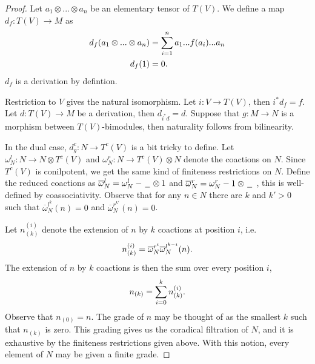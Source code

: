 \documentclass[../thesis.tex]{subfiles}
\begin{document}
            \begin{proof}
                Let $a_1\otimes ... \otimes a_n$ be an elementary tensor of $T(V)$. We define a map $d_f : T(V) \rightarrow M$ as
                \begin{align*}
                    d_f(a_1\otimes ... \otimes a_n) & = \sum_{i=1}^n a_1...f(a_i)...a_n \\
                    d_f(1) & = 0\tt{.} 
                \end{align*}
                $d_f$ is a derivation by defintion.
                
                Restriction to $V$ gives the natural isomorphism. Let $i : V\rightarrow T(V)$, then $i^*d_f = f$. Let $d : T(V) \rightarrow M$ be a derivation, then $d_{i^*d}=d$. Suppose that $g: M \rightarrow N$ is a morphism between $T(V)$-bimodules, then naturality follows from bilinearity.

                In the dual case, $d_g^c : N \rightarrow T^c(V)$ is a bit tricky to define. Let $\omega^l_N:N\rightarrow N\otimes T^c(V)$ and $\omega^r_N : N\rightarrow T^c(V) \otimes N$ denote the coactions on $N$. Since $T^c(V)$ is conilpotent, we get the same kind of finiteness restrictions on $N$. Define the reduced coactions as $\overline{\omega}^l_N = \omega^l_N - \argument\otimes 1$ and $\overline{\omega}^r_N = \omega^r_N - 1\otimes\argument\ $, this is well-defined by coassociativity. Observe that for any $n\in N$ there are $k$ and $k'>0$ such that ${\overline{\omega}^{l^k}_N}(n) = 0$ and ${\overline{\omega}^{r^{k'}}_N}(n)=0$.

                Let $n_{(k)}^{(i)}$ denote the extension of $n$ by $k$ coactions at position $i$, i.e. 
                \begin{align*}
                    n_{(k)}^{(i)} = \overline{\omega}^{r^i}_N\overline{\omega}^{l^{k-i}}_N(n)\tt{.} 
                \end{align*}
                The extension of $n$ by $k$ coactions is then the sum over every position $i$,
                \begin{align*}
                    n_{(k)} = \sum_{i=0}^kn_{(k)}^{(i)}\tt{.}
                \end{align*} 
                Observe that $n_{(0)} = n$. The grade of $n$ may be thought of as the smallest $k$ such that $n_{(k)}$ is zero. This grading gives us the coradical filtration of $N$, and it is exhaustive by the finiteness restrictions given above. With this notion, every element of $N$ may be given a finite grade.


\end{proof}
\end{document}
